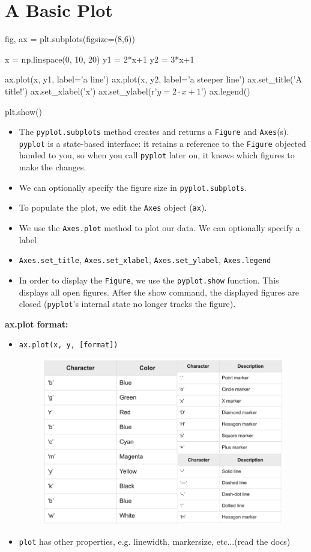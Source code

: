 \documentclass[12pt]{article}
\numberwithin{equation}{section}
\begin{document}
\section{A Basic Plot}
\begin{python}
fig, ax = plt.subplots(figsize=(8,6))

x = np.linspace(0, 10, 20)
y1 = 2*x+1
y2 = 3*x+1

ax.plot(x, y1, label='a line')
ax.plot(x, y2, label='a steeper line')
ax.set_title('A title!')
ax.set_xlabel('x')
ax.set_ylabel(r'$y = 2 \cdot x +1$')
ax.legend()

plt.show()
\end{python}

\begin{itemize}
    \item The \verb|pyplot.subplots| method creates and returns a \verb|Figure| and \verb|Axes|(s). \verb|pyplot| is a state-based interface: it retains a reference to the \verb|Figure| objected handed to you, so when you call \verb|pyplot|  later on, it knows which figures to make the changes.
    \item We can optionally specify the figure size in \verb|pyplot.subplots|.
    \item To populate the plot, we edit the \verb|Axes| object (\verb|ax|).
    \item We use the \verb|Axes.plot| method to plot our data. We can optionally specify a label
    \item \verb|Axes.set_title|, \verb|Axes.set_xlabel|, \verb|Axes.set_ylabel|, \verb|Axes.legend|
    \item In order to display the \verb|Figure|, we use the \verb|pyplot.show| function. This displays all open figures. After the show command, the displayed figures are closed (\verb|pyplot|'s internal state no longer tracks the figure).
\end{itemize}

\textbf{ax.plot format: }
\begin{itemize}
    \item \verb|ax.plot(x, y, [format])|
    \begin{figure}[H]
	    \centering
	    \includegraphics[width=12cm] {format}
    \end{figure}
    \item \verb|plot| has other properties, e.g. linewidth, markersize, etc...(read the docs)
\end{itemize}
\end{document}
